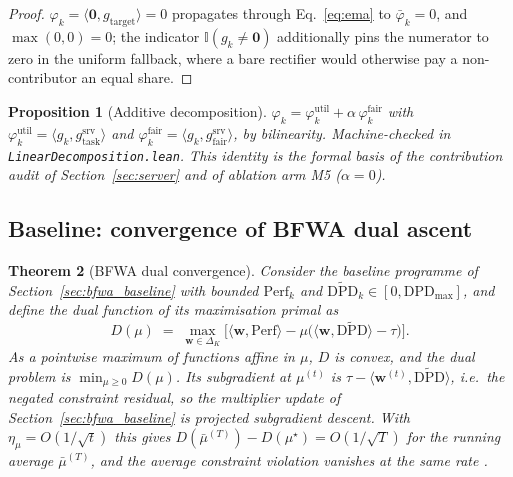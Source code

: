 \documentclass[preprint,12pt]{elsarticle}
\theoremstyle{plain}
\newtheorem{theorem}{Theorem}
\newtheorem{proposition}[theorem]{Proposition}
\theoremstyle{definition}
\theoremstyle{remark}
\newcommand{\dpd}{\mathrm{DPD}}
\begin{document}
\begin{proof}
$\varphi_k = \langle\bm{0},g_{\mathrm{target}}\rangle = 0$ propagates through Eq.~\eqref{eq:ema} to $\bar{\varphi}_k = 0$, and $\max(0,0) = 0$; the indicator $\mathbb{I}(g_k \neq \bm{0})$ additionally pins the numerator to zero in the uniform fallback, where a bare rectifier would otherwise pay a non-contributor an equal share.
\end{proof}

\begin{proposition}[Additive decomposition]\label{prop:decomposition}
$\varphi_k = \varphi_k^{\mathrm{util}} + \alpha\,\varphi_k^{\mathrm{fair}}$ with $\varphi_k^{\mathrm{util}} = \langle g_k, g_{\mathrm{task}}^{\mathrm{srv}}\rangle$ and $\varphi_k^{\mathrm{fair}} = \langle g_k, g_{\mathrm{fair}}^{\mathrm{srv}}\rangle$, by bilinearity. Machine-checked in \texttt{Linear\allowbreak Decomposition.lean}. This identity is the formal basis of the contribution audit of Section~\ref{sec:server} and of ablation arm M5 ($\alpha = 0$).
\end{proposition}

\subsection{Baseline: convergence of BFWA dual ascent}

\begin{theorem}[BFWA dual convergence]\label{thm:bfwa_convergence}
Consider the baseline programme of Section~\ref{sec:bfwa_baseline} with bounded $\mathrm{Perf}_k$ and $\widetilde{\dpd}_k \in [0,\dpd_{\max}]$, and define the dual function of its maximisation primal as
\begin{equation}
D(\mu) \;=\; \max_{\bm{w}\in\Delta_K}\Big[\langle \bm{w}, \mathrm{Perf}\rangle - \mu\big(\langle \bm{w}, \widetilde{\dpd}\rangle - \tau\big)\Big].
\label{eq:dual}
\end{equation}
As a pointwise \emph{maximum} of functions affine in $\mu$, $D$ is \emph{convex}, and the dual problem is $\min_{\mu \ge 0} D(\mu)$. Its subgradient at $\mu^{(t)}$ is $\tau - \langle \bm{w}^{(t)}, \widetilde{\dpd}\rangle$, i.e.\ the negated constraint residual, so the multiplier update of Section~\ref{sec:bfwa_baseline} is projected subgradient \emph{descent}. With $\eta_\mu = O(1/\sqrt{t})$ this gives $D(\bar{\mu}^{(T)}) - D(\mu^\star) = O(1/\sqrt{T})$ for the running average $\bar{\mu}^{(T)}$, and the average constraint violation vanishes at the same rate \cite{jaggi2013revisiting}.
\end{theorem}
\end{document}
